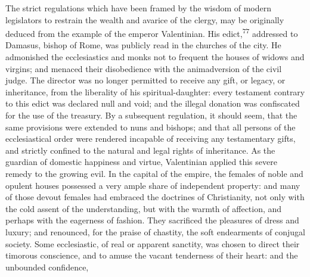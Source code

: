 


The strict regulations which have been framed by the wisdom of
modern legislators to restrain the wealth and avarice of the
clergy, may be originally deduced from the example of the emperor
Valentinian. His edict,\textsuperscript{77} addressed to Damasus, bishop of Rome,
was publicly read in the churches of the city. He admonished the
ecclesiastics and monks not to frequent the houses of widows and
virgins; and menaced their disobedience with the animadversion of
the civil judge. The director was no longer permitted to receive
any gift, or legacy, or inheritance, from the liberality of his
spiritual-daughter: every testament contrary to this edict was
declared null and void; and the illegal donation was confiscated
for the use of the treasury. By a subsequent regulation, it
should seem, that the same provisions were extended to nuns and
bishops; and that all persons of the ecclesiastical order were
rendered incapable of receiving any testamentary gifts, and
strictly confined to the natural and legal rights of inheritance.
As the guardian of domestic happiness and virtue, Valentinian
applied this severe remedy to the growing evil. In the capital of
the empire, the females of noble and opulent houses possessed a
very ample share of independent property: and many of those
devout females had embraced the doctrines of Christianity, not
only with the cold assent of the understanding, but with the
warmth of affection, and perhaps with the eagerness of fashion.
They sacrificed the pleasures of dress and luxury; and renounced,
for the praise of chastity, the soft endearments of conjugal
society. Some ecclesiastic, of real or apparent sanctity, was
chosen to direct their timorous conscience, and to amuse the
vacant tenderness of their heart: and the unbounded confidence,
